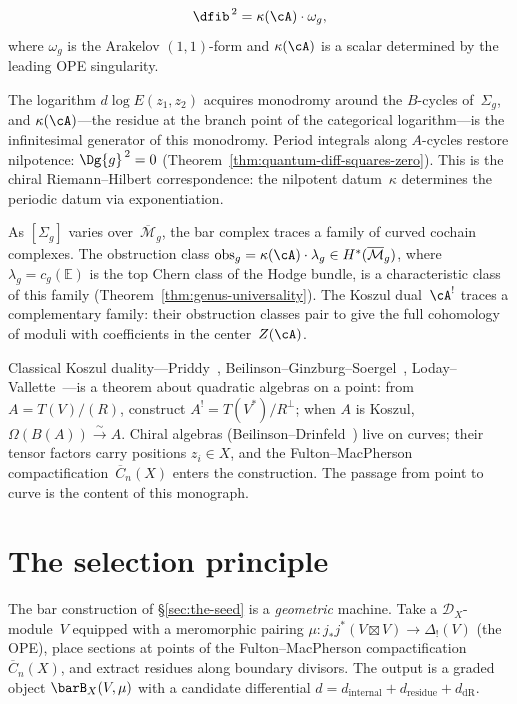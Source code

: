 \begin{equation}\label{eq:curvature-intro}
\dfib^{\,2} = \kappa(\cA) \cdot \omega_g,
\end{equation}
where $\omega_g$ is the Arakelov $(1,1)$-form and $\kappa(\cA)$
is a scalar determined by the leading OPE singularity.

The
logarithm $d\log E(z_1,z_2)$ acquires monodromy around the
$B$-cycles of~$\Sigma_g$, and $\kappa(\cA)$---the residue at the
branch point of the categorical logarithm---is the infinitesimal
generator of this monodromy.  Period integrals along $A$-cycles
restore nilpotence: $\Dg{g}^{\,2} = 0$
(Theorem~\ref{thm:quantum-diff-squares-zero}).
This is the chiral Riemann--Hilbert correspondence: the nilpotent
datum~$\kappa$ determines the periodic datum via exponentiation.

As $[\Sigma_g]$ varies over~$\overline{\mathcal{M}}_g$, the bar
complex traces a family of curved cochain complexes.  The
obstruction class $\mathrm{obs}_g = \kappa(\cA) \cdot \lambda_g \in
H^*(\overline{\mathcal{M}}_g)$, where $\lambda_g = c_g(\mathbb{E})$
is the top Chern class of the Hodge bundle, is a characteristic
class of this family (Theorem~\ref{thm:genus-universality}).
The Koszul dual~$\cA^!$ traces a complementary family: their
obstruction classes pair to give the full cohomology of moduli with
coefficients in the center~$Z(\cA)$.

Classical Koszul duality---Priddy~\cite{Priddy70},
Beilinson--Ginzburg--Soergel~\cite{BGS96},
Loday--Vallette~\cite{LV12}---is a theorem about quadratic algebras
on a point: from $A = T(V)/(R)$, construct
$A^! = T(V^*)/R^\perp$; when $A$ is Koszul,
$\Omega(B(A)) \xrightarrow{\sim} A$.
Chiral algebras (Beilinson--Drinfeld~\cite{BD04}) live on curves;
their tensor factors carry positions $z_i \in X$, and the
Fulton--MacPherson compactification~$\overline{C}_n(X)$ enters the
construction.  The passage from point to curve is the content of
this monograph.


\section{The selection principle}
\label{sec:selection-principle}

The bar construction of \S\ref{sec:the-seed} is a
\emph{geometric} machine.  Take a $\mathcal{D}_X$-module~$V$
equipped with a meromorphic pairing
$\mu \colon j_* j^*(V \boxtimes V) \to \Delta_!(V)$
(the OPE), place sections at points of the Fulton--MacPherson
compactification~$\overline{C}_n(X)$, and extract residues along
boundary divisors.  The output is a graded object
$\barB_X(V, \mu)$ with a candidate differential
$d = d_{\mathrm{internal}} + d_{\mathrm{residue}}
+ d_{\mathrm{dR}}$.

